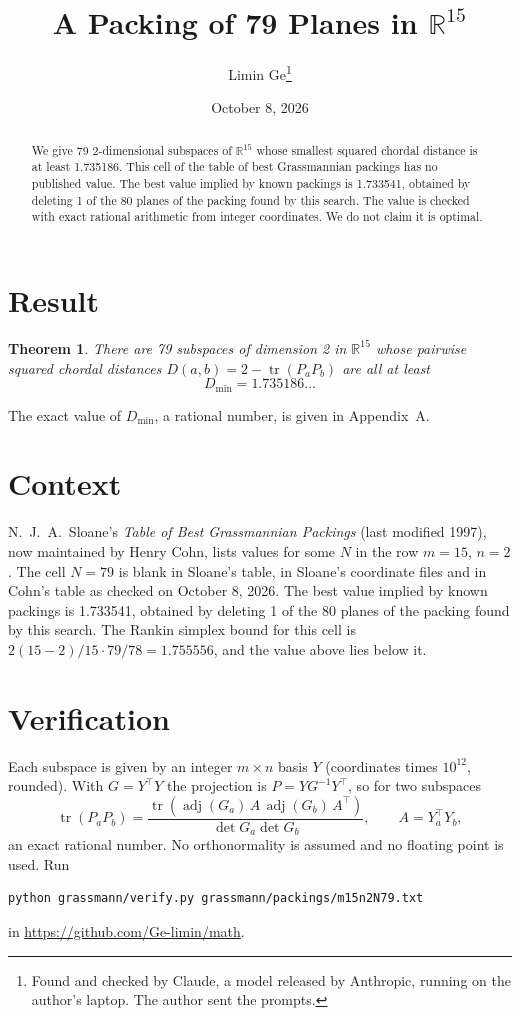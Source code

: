 \documentclass[11pt,a4paper]{article}
\title{A Packing of 79 Planes in $\mathbb{R}^{15}$}
\author{Limin Ge\thanks{Found and checked by Claude, a model released by Anthropic, running on the author's laptop. The author sent the prompts.}}
\date{October 8, 2026}
\newtheorem*{theorem}{Theorem}
\begin{document}
\maketitle
\begin{abstract}
We give 79 2-dimensional subspaces of $\mathbb{R}^{15}$ whose smallest squared chordal distance is at least 1.735186. This cell of the table of best Grassmannian packings has no published value. The best value implied by known packings is 1.733541, obtained by deleting 1 of the 80 planes of the packing found by this search. The value is checked with exact rational arithmetic from integer coordinates. We do not claim it is optimal.
\end{abstract}

\section{Result}
\begin{theorem}
There are 79 subspaces of dimension 2 in $\mathbb{R}^{15}$ whose pairwise squared chordal distances $D(a,b) = 2 - \operatorname{tr}(P_aP_b)$ are all at least
\[ D_{\min} = 1.735186\ldots \]
\end{theorem}
The exact value of $D_{\min}$, a rational number, is given in Appendix~A.


\section{Context}
N.~J.~A.~Sloane's \emph{Table of Best Grassmannian Packings} (last modified 1997), now maintained by Henry Cohn, lists values for some $N$ in the row $m=15$, $n=2$. The cell $N=79$ is blank in Sloane's table, in Sloane's coordinate files and in Cohn's table as checked on October 8, 2026. The best value implied by known packings is 1.733541, obtained by deleting 1 of the 80 planes of the packing found by this search. The Rankin simplex bound for this cell is $2(15-2)/15\cdot 79/78 = 1.755556$, and the value above lies below it.


\section{Verification}
Each subspace is given by an integer $m\times n$ basis $Y$ (coordinates times $10^{12}$, rounded). With $G=Y^\top Y$ the projection is $P=YG^{-1}Y^\top$, so for two subspaces
\[ \operatorname{tr}(P_aP_b)=\frac{\operatorname{tr}(\operatorname{adj}(G_a)\,A\,\operatorname{adj}(G_b)\,A^\top)}{\det G_a\det G_b},\qquad A=Y_a^\top Y_b, \]
an exact rational number. No orthonormality is assumed and no floating point is used. Run
\begin{verbatim}
python grassmann/verify.py grassmann/packings/m15n2N79.txt
\end{verbatim}
in \url{https://github.com/Ge-limin/math}.
\end{document}
